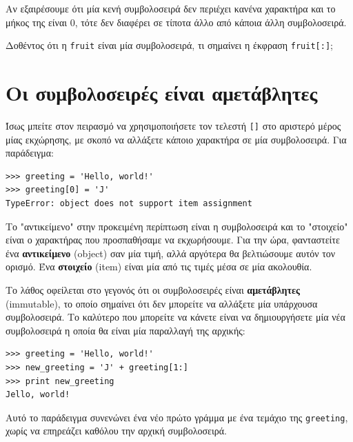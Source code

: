 \documentclass[10pt]{book}
\begin{document}
Αν εξαιρέσουμε ότι μία κενή συμβολοσειρά δεν περιέχει κανένα χαρακτήρα και το μήκος της είναι 0, τότε δεν διαφέρει σε τίποτα άλλο από κάποια άλλη συμβολοσειρά.
\\

\begin{exercise}

Δοθέντος ότι η {\tt fruit} είναι μία συμβολοσειρά, τι σημαίνει η έκφραση {\tt fruit[:]};
\end{exercise}



\section{Οι συμβολοσειρές είναι αμετάβλητες}

Ίσως μπείτε στον πειρασμό να χρησιμοποιήσετε τον τελεστή {\tt []} στο αριστερό μέρος μίας εκχώρησης, με σκοπό να αλλάξετε κάποιο χαρακτήρα σε μία συμβολοσειρά. Για παράδειγμα:

\begin{verbatim}
>>> greeting = 'Hello, world!'
>>> greeting[0] = 'J'
TypeError: object does not support item assignment
\end{verbatim}
%

Το "αντικείμενο" στην προκειμένη περίπτωση είναι η συμβολοσειρά και το "στοιχείο" είναι ο χαρακτήρας που προσπαθήσαμε να εκχωρήσουμε. Για την ώρα, φανταστείτε ένα {\bf αντικείμενο} (object) σαν μία τιμή, αλλά αργότερα θα βελτιώσουμε αυτόν τον ορισμό. Ένα {\bf στοιχείο} (item) είναι μία από τις τιμές μέσα σε μία ακολουθία.

Το λάθος οφείλεται στο γεγονός ότι οι συμβολοσειρές είναι {\bf αμετάβλητες} (immutable), το οποίο σημαίνει ότι δεν μπορείτε να αλλάξετε μία υπάρχουσα συμβολοσειρά. Το καλύτερο που μπορείτε να κάνετε είναι να δημιουργήσετε μία νέα συμβολοσειρά η οποία θα είναι μία παραλλαγή της αρχικής:

\begin{verbatim}
>>> greeting = 'Hello, world!'
>>> new_greeting = 'J' + greeting[1:]
>>> print new_greeting
Jello, world!
\end{verbatim}
%

Αυτό το παράδειγμα συνενώνει ένα νέο πρώτο γράμμα με ένα τεμάχιο της {\tt greeting}, χωρίς να επηρεάζει καθόλου την αρχική συμβολοσειρά.
\end{document}
